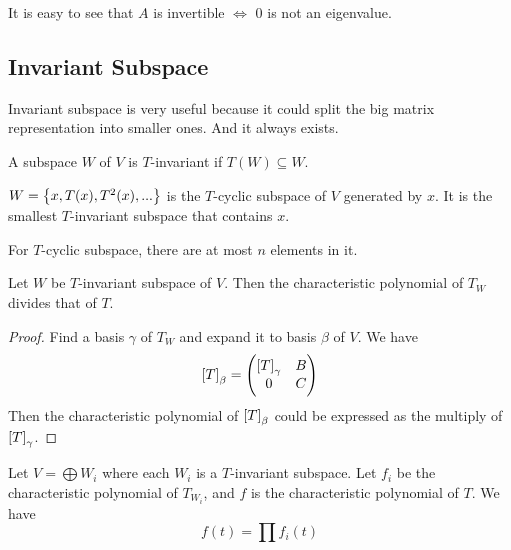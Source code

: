It is easy to see that $A$ is invertible $\Leftrightarrow$ $0$ is not an eigenvalue.


\subsection{Invariant Subspace}

Invariant subspace is very useful because it could split the big matrix representation into smaller ones. And it always exists.

\begin{definition}[$T$-invariant]
    A subspace $W$ of $V$ is $T$-invariant if $T(W) \subseteq W$.
\end{definition}

\begin{definition}[$T$-cyclic]
    $W = \set{x, T(x), T^2(x), ...}$ is the $T$-cyclic subspace of $V$ generated by $x$. It is the smallest $T$-invariant subspace that contains $x$.
\end{definition}

For $T$-cyclic subspace, there are at most $n$ elements in it. 

\begin{theorem}\label{split_of_invariant_subspace}
    Let $W$ be $T$-invariant subspace of $V$. Then the characteristic polynomial of $T_W$ divides that of $T$.    
\end{theorem}
\begin{proof}
    Find a basis $\gamma$ of $T_W$ and expand it to basis $\beta$ of $V$. We have 
    \begin{equation*}
        \coordinate{T}_\beta = \begin{pmatrix}
            \coordinate{T}_\gamma & B \\
            0 & C        
        \end{pmatrix}
    \end{equation*}
    Then the characteristic polynomial of $\coordinate{T}_\beta$ could be expressed as the multiply of $\coordinate{T}_\gamma$.
\end{proof}

\begin{theorem}
    Let $V = \bigoplus W_i$ where each $W_i$ is a $T$-invariant subspace. Let $f_i$ be the characteristic polynomial of $T_{W_i}$, and $f$ is the characteristic polynomial of $T$. We have 
    \begin{equation}
        f(t) = \prod f_i (t)
    \end{equation}
\end{theorem}



